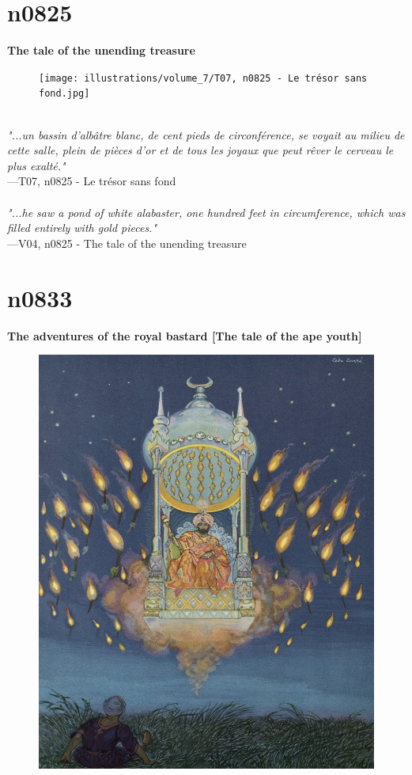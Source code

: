 \documentclass[../Carre_nights.tex]{subfiles}
\begin{document}
\section{n0825}
\textbf{\Large{The tale of the unending treasure}} \\

\begin{figure}[ht]
\centering
\texttt{[image: illustrations/volume\_7/T07, n0825 - Le trésor sans fond.jpg]}
\end{figure}

\textit{\\
"...un bassin d’albâtre blanc, de cent pieds de circonférence, se voyait au milieu de cette salle, plein de pièces d’or et de tous les joyaux que peut rêver le cerveau le plus exalté."} \\
—T07, n0825 - Le trésor sans fond \\~\\
\textit{"...he saw a pond of white alabaster, one hundred feet in circumference, which was filled entirely with gold pieces."} \\
—V04, n0825 - The tale of the unending treasure

\newpage

\section{n0833}
\textbf{\Large{The adventures of the royal bastard [The tale of the ape youth]}} \\

\begin{figure}[ht]
\centering
\includegraphics[height=\figsize]{illustrations/volume_7/T07, n0833 - Histoire compliquée de l’adultérin sympathique [Histoire du singe jouvenceau].jpg}
\end{figure}
\end{document}
